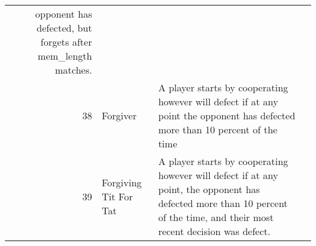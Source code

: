 \begin{table}[H]
\begin{adjustbox}{height=0.8\textwidth, width=1.1\textwidth}
\begin{tabular}{rlll}
	opponent has defected, but forgets after mem\_length matches.                                                                                                                                                                                                                                                                                                                                                                                                                                                                                                                                                                                                                                                                                                                                                                                                                                                                                  \\
	38   & Forgiver                    & A player starts by cooperating however will defect if at any point
	the opponent has defected more than 10 percent of the time                                                                                                                                                                                                                                                                                                                                                                                                                                                                                                                                                                                                                                                                                                                                                                                                                                                                                        \\
	39   & Forgiving Tit For Tat       & A player starts by cooperating however will defect if at any point,
	the opponent has defected more than 10 percent of the time,
	and their most recent decision was defect.                                                                                                                                                                                                                                                                                                                                                                                                                                                                                                                                                                                                                                                                                                                                                                                                                                       \\

\end{tabular}
\end{adjustbox}
\end{table}
